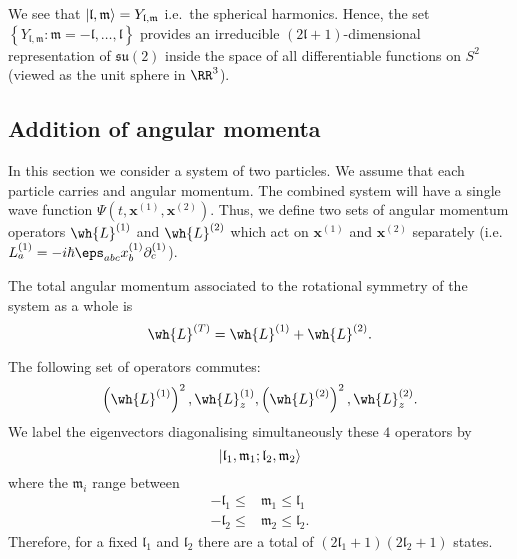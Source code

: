 \documentclass[12pt, a4paper]{article}
\begin{document}
\begin{mdthm}
    We see that \(\ket{\mathfrak{l},\mathfrak{m}}=Y_{\mathfrak{l,m}}\) i.e.\ the spherical harmonics. Hence, the set \({\left\{ Y_{\mathfrak{l,m}} : \mathfrak{m}= -\mathfrak{l},\ldots,\mathfrak{l} \right\}}\) provides an irreducible \((2\mathfrak{l}+1)\)-dimensional representation of \(\mathfrak{su}(2)\) inside the space of all differentiable functions on \(S^2\) (viewed as the unit sphere in \(\RR^3\)).
\end{mdthm}

\subsection{Addition of angular momenta}

In this section we consider a system of two particles. We assume that each particle carries and angular momentum. The combined system will have a single wave function \(\Psi(t,\bm{x}^{(1)},\bm{x}^{(2)})\). Thus, we define two sets of angular momentum operators \(\wh{L}^{(1)}\) and \(\wh{L}^{(2)}\) which act on \(\bm{x}^{(1)}\) and \(\bm{x}^{(2)}\) separately (i.e. \(L^{(1)}_a = -i\hbar\eps_{abc} x_b^{(1)}\partial^{(1)}_c\)).

\begin{definition}
    The total angular momentum associated to the rotational symmetry of the system as a whole is 
    \[\wh{L}^{(T)}=\wh{L}^{(1)}+\wh{L}^{(2)}.\]
\end{definition}

\begin{proposition}
    The following set of operators commutes:
    \[\left( \wh{L}^{(1)} \right)^2, \wh{L}_z^{(1)},\left( \wh{L}^{(2)} \right)^2, \wh{L}_z^{(2)}.\]
    We label the eigenvectors diagonalising simultaneously these \(4\) operators by  
    \[\ket{\mathfrak{l}_1,\mathfrak{m}_1;\mathfrak{l}_2,\mathfrak{m}_2}\]
    where the \(\mathfrak{m}_i\) range between 
    \[\begin{aligned}
        -\mathfrak{l}_1 \leq &\mathfrak{m}_1 \leq \mathfrak{l}_1 \\
        -\mathfrak{l}_2 \leq &\mathfrak{m}_2 \leq \mathfrak{l}_2.
    \end{aligned}\]
    Therefore, for a fixed \(\mathfrak{l}_1\) and \(\mathfrak{l}_2\) there are a total of \((2\mathfrak{l}_1+1)(2\mathfrak{l}_2+1)\) states.
\end{proposition}
\end{document}
